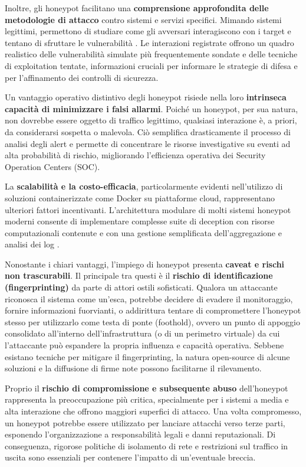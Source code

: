 Inoltre, gli honeypot facilitano una \textbf{comprensione approfondita delle metodologie di attacco} contro sistemi e servizi specifici. Mimando sistemi legittimi, permettono di studiare come gli avversari interagiscono con i target e tentano di sfruttare le vulnerabilità \cite{mairh2011}. Le interazioni registrate offrono un quadro realistico delle vulnerabilità simulate più frequentemente sondate e delle tecniche di exploitation tentate, informazioni cruciali per informare le strategie di difesa e per l'affinamento dei controlli di sicurezza.

Un vantaggio operativo distintivo degli honeypot risiede nella loro \textbf{intrinseca capacità di minimizzare i falsi allarmi}. Poiché un honeypot, per sua natura, non dovrebbe essere oggetto di traffico legittimo, qualsiasi interazione è, a priori, da considerarsi sospetta o malevola. Ciò semplifica drasticamente il processo di analisi degli alert e permette di concentrare le risorse investigative su eventi ad alta probabilità di rischio, migliorando l'efficienza operativa dei Security Operation Centers (SOC).

La \textbf{scalabilità e la costo-efficacia}, particolarmente evidenti nell'utilizzo di soluzioni containerizzate come Docker su piattaforme cloud, rappresentano ulteriori fattori incentivanti. L'architettura modulare di molti sistemi honeypot moderni consente di implementare complesse suite di deception con risorse computazionali contenute e con una gestione semplificata dell'aggregazione e analisi dei log \cite{mairh2011}.

Nonostante i chiari vantaggi, l'impiego di honeypot presenta \textbf{caveat e rischi non trascurabili}. Il principale tra questi è il \textbf{rischio di identificazione (fingerprinting)} da parte di attori ostili sofisticati. Qualora un attaccante riconosca il sistema come un'esca, potrebbe decidere di evadere il monitoraggio, fornire informazioni fuorvianti, o addirittura tentare di compromettere l'honeypot stesso per utilizzarlo come testa di ponte (foothold), ovvero un punto di appoggio consolidato all'interno dell'infrastruttura (o di un perimetro virtuale) da cui l'attaccante può espandere la propria influenza e capacità operativa. Sebbene esistano tecniche per mitigare il fingerprinting, la natura open-source di alcune soluzioni e la diffusione di firme note possono facilitarne il rilevamento.

Proprio il \textbf{rischio di compromissione e subsequente abuso} dell'honeypot rappresenta la preoccupazione più critica, specialmente per i sistemi a media e alta interazione che offrono maggiori superfici di attacco. Una volta compromesso, un honeypot potrebbe essere utilizzato per lanciare attacchi verso terze parti, esponendo l'organizzazione a responsabilità legali e danni reputazionali. Di conseguenza, rigorose politiche di isolamento di rete e restrizioni sul traffico in uscita sono essenziali per contenere l'impatto di un'eventuale breccia.

